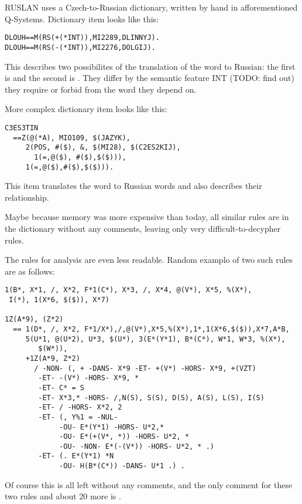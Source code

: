 RUSLAN uses a Czech-to-Russian dictionary, written by hand in afforementioned Q-Systems. Dictionary item looks like this:

\begin{verbatim}
DLOUH==M(RS(+(*INT)),MI2289,DLINNYJ).
DLOUH==M(RS(-(*INT)),MI2276,DOLGIJ).
\end{verbatim}

This describes two possibilites of the translation of the word  to Russian: the first is  and the second is . They differ by the semantic feature INT (TODO: find out) they require or forbid from the word they depend on. 

More complex dictionary item looks like this:
\begin{verbatim}
C3ES3TIN
  ==Z(@(*A), MIO109, $(JAZYK), 
     2(POS, #($), &, $(MI28), $(C2ES2KIJ),
       1(=,@($), #($),$($))),
     1(=,@($),#($),$($))).
\end{verbatim}

This item translates the word  to Russian words  and also describes their relationship.

Maybe because memory was more expensive than today, all similar rules are in the dictionary without any comments, leaving only very difficult-to-decypher rules.

The rules for analysis are even less readable. Random examplo of two such rules are as follows:

\begin{verbatim}
1(B*, X*1, /, X*2, F*1(C*), X*3, /, X*4, @(V*), X*5, %(X*),
 I(*), 1(X*6, $($)), X*7)

1Z(A*9), (Z*2)
  == 1(D*, /, X*2, F*1/X*),/,@(V*),X*5,%(X*),1*,1(X*6,$($)),X*7,A*B,
     5(U*1, @(U*2), U*3, $(U*), 3(E*(Y*1), B*(C*), W*1, W*3, %(X*), 
        $(W*)),
     +1Z(A*9, Z*2)
       / -NON- (, + -DANS- X*9 -ET- +(V*) -HORS- X*9, +(VZT)
        -ET- -(V*) -HORS- X*9, *
        -ET- C* = S
        -ET- X*3,* -HORS- /,N(S), S(S), D(S), A(S), L(S), I(S)
        -ET- / -HORS- X*2, 2
        -ET- (, Y%1 = -NUL-
             -OU- E*(Y*1) -HORS- U*2,*
             -OU- E*(+(V*, *)) -HORS- U*2, *
             -OU- -NON- E*(-(V*)) -HORS- U*2, * .)
        -ET- (. E*(Y*1) *N
             -OU- H(B*(C*)) -DANS- U*1 .) .
\end{verbatim}

Of course this is all left without any comments, and the only comment for these two rules and about 20 more is .


